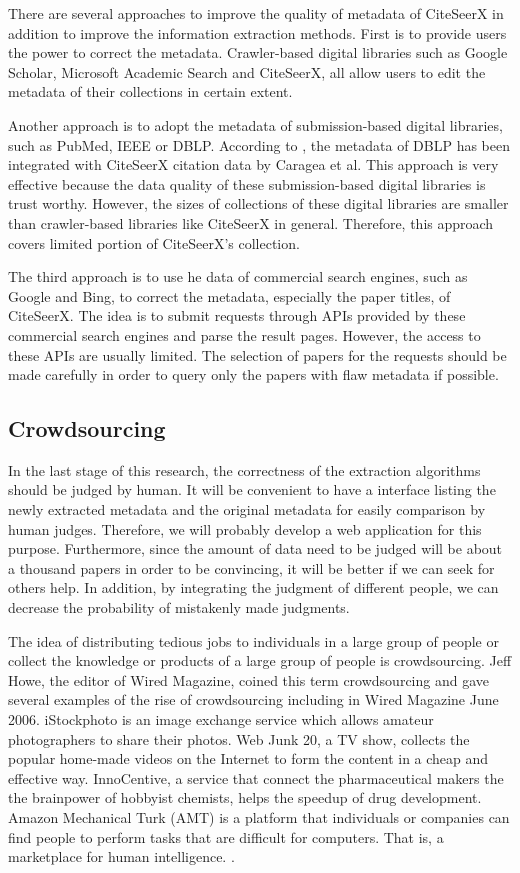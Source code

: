 \documentclass[prodmode]{acmsmall} %
\begin{document}
There are several approaches to improve the quality of metadata of CiteSeerX in addition to improve the information extraction methods. First is to provide users the power to correct the metadata. Crawler-based digital libraries such as Google Scholar, Microsoft Academic Search and CiteSeerX, all allow users to edit the metadata of their collections in certain extent. \cite{Wu2014a}

Another approach is to adopt the metadata of submission-based digital libraries, such as PubMed, IEEE or DBLP. According to \cite{OrorbiaII}, the metadata of DBLP has been integrated with CiteSeerX citation data by Caragea et al. This approach is very effective because the data quality of these submission-based digital libraries is trust worthy. However, the sizes of collections of these digital libraries are smaller than crawler-based libraries like CiteSeerX in general. Therefore, this approach covers limited portion of CiteSeerX's collection.

The third approach is to use he data of commercial search engines, such as Google and Bing, to correct the metadata, especially the paper titles, of CiteSeerX. The idea is to submit requests through APIs provided by these commercial search engines and parse the result pages. However, the access to these APIs are usually limited. The selection of papers for the requests should be made carefully in order to query only the papers with flaw metadata if possible. \cite{OrorbiaII}

\subsection{Crowdsourcing}

In the last stage of this research, the correctness of the extraction algorithms should be judged by human. It will be convenient to have a interface listing the newly extracted metadata and the original metadata for easily comparison by human judges. Therefore, we will probably develop a web application for this purpose. Furthermore, since the amount of data need to be judged will be about a thousand papers in order to be convincing, it will be better if we can seek for others help. In addition, by integrating the judgment of different people, we can decrease the probability of mistakenly made judgments.

The idea of distributing tedious jobs to individuals in a large group of people or collect the knowledge or products of a large group of people is crowdsourcing. Jeff Howe, the editor of Wired Magazine, coined this term crowdsourcing and gave several examples of the rise of crowdsourcing including in Wired Magazine June 2006. iStockphoto is an image exchange service which allows amateur photographers to share their photos. Web Junk 20, a TV show, collects the popular home-made videos on the Internet to form the content in a cheap and effective way. InnoCentive, a service that connect the pharmaceutical makers the the brainpower of hobbyist chemists, helps the speedup of drug development. Amazon Mechanical Turk (AMT) is a platform that individuals or companies can find people to perform tasks that are difficult for computers. That is, a marketplace for human intelligence. \cite{Howe2006}.
\end{document}
